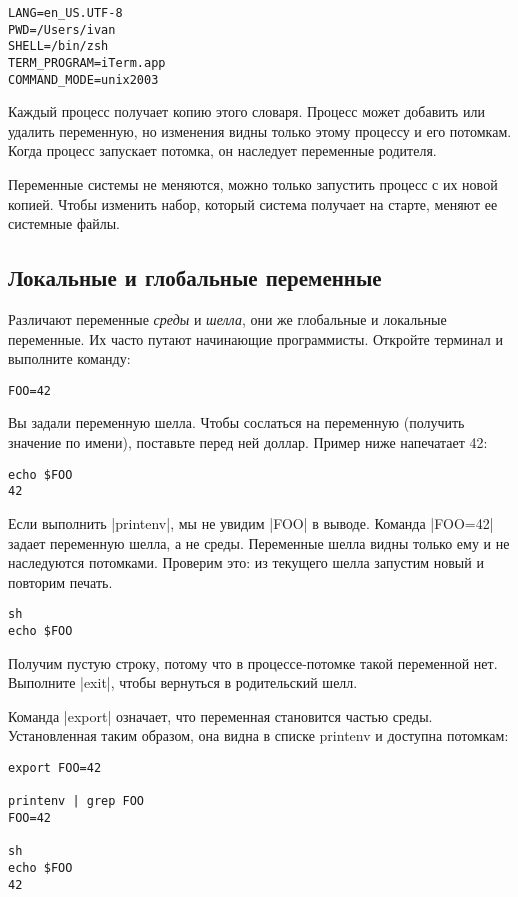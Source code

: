 \begin{verbatim}
LANG=en_US.UTF-8
PWD=/Users/ivan
SHELL=/bin/zsh
TERM_PROGRAM=iTerm.app
COMMAND_MODE=unix2003
\end{verbatim}

Каждый процесс получает копию этого словаря. Процесс может добавить или удалить
переменную, но изменения видны только этому процессу и его потомкам. Когда
процесс запускает потомка, он наследует переменные родителя.

Переменные системы не меняются, можно только запустить процесс с их новой
копией. Чтобы изменить набор, который система получает на старте, меняют ее
системные файлы.

\subsection{Локальные и глобальные переменные}

Различают переменные \emph{среды} и \emph{шелла}, они же глобальные и локальные
переменные. Их часто путают начинающие программисты. Откройте терминал и
выполните команду:

\begin{verbatim}
FOO=42
\end{verbatim}

Вы задали переменную шелла. Чтобы сослаться на переменную (получить значение по
имени), поставьте перед ней доллар. Пример ниже напечатает 42:

\begin{verbatim}
echo $FOO
42
\end{verbatim}

Если выполнить \spverb|printenv|, мы не увидим \spverb|FOO| в выводе. Команда
\spverb|FOO=42| задает переменную шелла, а не среды. Переменные шелла видны
только ему и не наследуются потомками. Проверим это: из текущего шелла запустим
новый и повторим печать.

\begin{verbatim}
sh
echo $FOO
\end{verbatim}

Получим пустую строку, потому что в процессе-потомке такой переменной
нет. Выполните \spverb|exit|, чтобы вернуться в родительский шелл.

Команда \spverb|export| означает, что переменная становится частью
среды. Установленная таким образом, она видна в списке printenv и доступна
потомкам:

\begin{verbatim}
export FOO=42

printenv | grep FOO
FOO=42

sh
echo $FOO
42
\end{verbatim}

